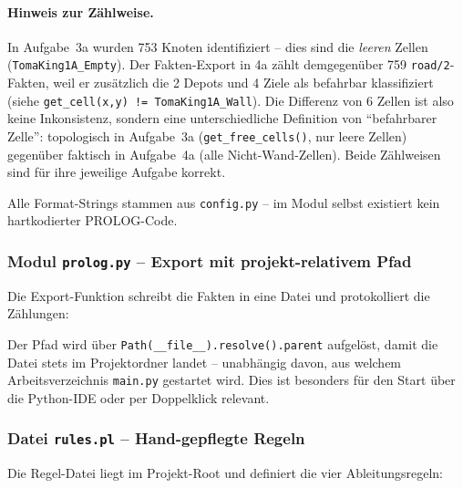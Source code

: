 \paragraph{Hinweis zur Z\"ahlweise.}
In Aufgabe~3a wurden 753 Knoten identifiziert -- dies sind die \emph{leeren} Zellen (\texttt{TomaKing1A\_Empty}). Der Fakten-Export in 4a z\"ahlt demgegen\"uber 759 \texttt{road/2}-Fakten, weil er zus\"atzlich die 2 Depots und 4 Ziele als befahrbar klassifiziert (siehe \texttt{get\_cell(x,y) != TomaKing1A\_Wall}). Die Differenz von 6 Zellen ist also keine Inkonsistenz, sondern eine unterschiedliche Definition von \enquote{befahrbarer Zelle}: topologisch in Aufgabe~3a (\texttt{get\_free\_cells()}, nur leere Zellen) gegen\"uber faktisch in Aufgabe~4a (alle Nicht-Wand-Zellen). Beide Z\"ahlweisen sind f\"ur ihre jeweilige Aufgabe korrekt.

Alle Format-Strings stammen aus \texttt{config.py} -- im Modul selbst existiert kein hartkodierter \acs{PROLOG}-Code.


\subsubsection{Modul \texttt{prolog.py} – Export mit projekt-relativem Pfad}

Die Export-Funktion schreibt die Fakten in eine Datei und protokolliert die Zählungen:



Der Pfad wird über \texttt{Path(\_\_file\_\_).resolve().parent} aufgelöst, damit die Datei stets im Projektordner landet -- unabhängig davon, aus welchem Arbeitsverzeichnis \texttt{main.py} gestartet wird. Dies ist besonders für den Start über die Python-IDE oder per Doppelklick relevant.


\subsubsection{Datei \texttt{rules.pl} – Hand-gepflegte Regeln}

Die Regel-Datei liegt im Projekt-Root und definiert die vier Ableitungsregeln:



